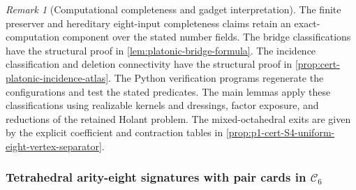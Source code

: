 \documentclass[11pt,letterpaper,onecolumn]{article}
\theoremstyle{plain}
\theoremstyle{definition}
\theoremstyle{remark}
\newtheorem{remark}[remark]{Remark}
\begin{document}
\begin{remark}[Computational completeness and gadget interpretation]
\label{rem:cert-platonic-scope}
The finite preserver and hereditary eight-input completeness claims
retain an exact-computation component over the stated number fields.
The bridge classifications have the structural proof in
\cref{lem:platonic-bridge-formula}.
The incidence classification and deletion connectivity have the structural
proof in \cref{prop:cert-platonic-incidence-atlas}.
The Python verification programs regenerate the configurations and test the stated
predicates. The main lemmas apply these classifications using realizable kernels
and dressings, factor exposure, and reductions of the retained Holant problem.
The mixed-octahedral exits are given by the explicit coefficient and
contraction tables in
\cref{prop:p1-cert-S4-uniform-eight-vertex-separator}.
\end{remark}

\subsubsection{Tetrahedral arity-eight signatures with pair cards in \texorpdfstring{\(\mathscr C_6\)}{C6}}
\label{proofsubsec:cert-A4-b8-parent-audit}
\end{document}

